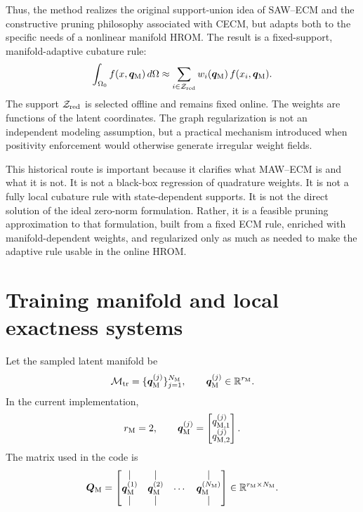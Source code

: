 \documentclass[11pt,a4paper]{article}
\begin{document}
Thus, the method realizes the original support-union idea of SAW--ECM and the
constructive pruning philosophy associated with CECM, but adapts both to the
specific needs of a nonlinear manifold HROM. The result is a fixed-support,
manifold-adaptive cubature rule:
\[
        \int_{\Omega_0} f(x,\bm q_{\mathrm{M}})\,d\Omega
        \approx
        \sum_{i\in\mathcal{Z}_{\mathrm{red}}}
        w_i(\bm q_{\mathrm{M}})\,
        f(x_i,\bm q_{\mathrm{M}}).
\]
The support $\mathcal{Z}_{\mathrm{red}}$ is selected offline and remains fixed online. The weights
are functions of the latent coordinates. The graph regularization is not an
independent modeling assumption, but a practical mechanism introduced when
positivity enforcement would otherwise generate irregular weight fields.

This historical route is important because it clarifies what MAW--ECM is and
what it is not. It is not a black-box regression of quadrature weights. It is
not a fully local cubature rule with state-dependent supports. It is not the
direct solution of the ideal zero-norm formulation. Rather, it is a feasible
pruning approximation to that formulation, built from a fixed ECM rule, enriched
with manifold-dependent weights, and regularized only as much as needed to make
the adaptive rule usable in the online HROM.





\section{Training manifold and local exactness systems}

Let the sampled latent manifold be
\[
        \mathcal{M}_{\mathrm{tr}}
        =
        \{\bm q_{\mathrm{M}}^{(j)}\}_{j=1}^{N_{\mathrm{M}}},
        \qquad
        \bm q_{\mathrm{M}}^{(j)}\in\mathbb{R}^{r_{\mathrm{M}}}.
\]
In the current implementation,
\[
        r_{\mathrm{M}} = 2,
        \qquad
        \bm q_{\mathrm{M}}^{(j)} =
        \begin{bmatrix}
        q_{\mathrm{M},1}^{(j)} \\
        q_{\mathrm{M},2}^{(j)}
        \end{bmatrix}.
\]
The matrix used in the code is
\[
        \bm Q_{\mathrm{M}} =
        \begin{bmatrix}
        | & | &        & | \\
        \bm q_{\mathrm{M}}^{(1)} & \bm q_{\mathrm{M}}^{(2)} & \cdots & \bm q_{\mathrm{M}}^{(N_{\mathrm{M}})} \\
        | & | &        & |
        \end{bmatrix}
        \in\mathbb{R}^{r_{\mathrm{M}}\times N_{\mathrm{M}}}.
\]
\end{document}
